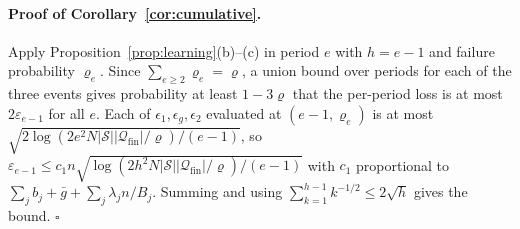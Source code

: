 \documentclass[opre,dblanonrev]{informs4}
\providecommand{\1}{\mathbf{1}}
\begin{document}
\begin{APPENDICES}
\paragraph{Proof of Corollary~\ref{cor:cumulative}.}
Apply Proposition~\ref{prop:learning}(b)--(c) in period $e$ with $h=e-1$ and failure probability $\varrho_e$. Since $\sum_{e\ge2}\varrho_e=\varrho$, a union bound over periods for each of the three events gives probability at least $1-3\varrho$ that the per-period loss is at most $2\varepsilon_{e-1}$ for all $e$. Each of $\epsilon_1,\epsilon_g,\epsilon_2$ evaluated at $(e-1,\varrho_e)$ is at most $\sqrt{2\log(2e^2N|\mathcal S||\mathcal Q_{\mathrm{fin}}|/\varrho)/(e-1)}$, so $\varepsilon_{e-1}\le c_1n\sqrt{\log(2h^2N|\mathcal S||\mathcal Q_{\mathrm{fin}}|/\varrho)/(e-1)}$ with $c_1$ proportional to $\sum_jb_j+\bar g+\sum_j\lambda_jn/B_j$. Summing and using $\sum_{k=1}^{h-1}k^{-1/2}\le2\sqrt h$ gives the bound. \hfill$\square$

\end{APPENDICES}








\end{document}
